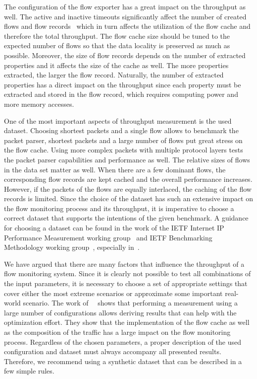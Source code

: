 The configuration of the flow exporter has a great impact on the throughput as well. The active and inactive timeouts significantly affect the number of created flows and flow records~\cite{Hofstede-2014-Flow} which in turn affects the utilization of the flow cache and therefore the total throughput. The flow cache size should be tuned to the expected number of flows so that the data locality is preserved as much as possible. Moreover, the size of flow records depends on the number of extracted properties and it affects the size of the cache as well. The more properties extracted, the larger the flow record. Naturally, the number of extracted properties has a direct impact on the throughput since each property must be extracted and stored in the flow record, which requires computing power and more memory accesses.

One of the most important aspects of throughput measurement is the used dataset. Choosing shortest packets and a single flow allows to benchmark the packet parser, shortest packets and a large number of flows put great stress on the flow cache. Using more complex packets with multiple protocol layers tests the packet parser capabilities and performance as well. The relative sizes of flows in the data set matter as well. When there are a few dominant flows, the corresponding flow records are kept cached and the overall performance increases. However, if the packets of the flows are equally interlaced, the caching of the flow records is limited. Since the choice of the dataset has such an extensive impact on the flow monitoring process and its throughput, it is imperative to choose a correct dataset that supports the intentions of the given benchmark. A guidance for choosing a dataset can be found in the work of the IETF Internet IP Performance Measurement working group~\cite{IESG-1997-IP} and IETF Benchmarking Methodology working group~\cite{IESG-1989-Benchmarking}, especially in~\cite{rfc2330, rfc6985}.

We have argued that there are many factors that influence the throughput of a flow monitoring system. Since it is clearly not possible to test all combinations of the input parameters, it is necessary to choose a set of appropriate settings that cover either the most extreme scenarios or approximate some important real-world scenario. The work of~\citeauthor{Nassopulos-2014-Flow}~\cite{Nassopulos-2014-Flow} shows that performing a measurement using a large number of configurations allows deriving results that can help with the optimization effort. They show that the implementation of the flow cache as well as the composition of the traffic has a large impact on the flow monitoring process. Regardless of the chosen parameters, a proper description of the used configuration and dataset must always accompany all presented results. Therefore, we recommend using a synthetic dataset that can be described in a few simple rules.


